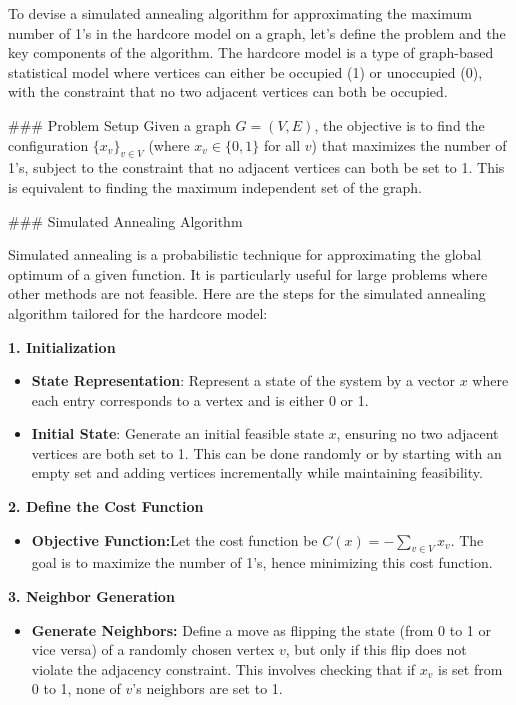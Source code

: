 \documentclass[8pt]{article}
\begin{document}
To devise a simulated annealing algorithm for approximating the maximum number of 1's in the hardcore model on a graph, let's define the problem and the key components of the algorithm. The hardcore model is a type of graph-based statistical model where vertices can either be occupied (1) or unoccupied (0), with the constraint that no two adjacent vertices can both be occupied.

### Problem Setup
Given a graph \( G = (V, E) \), the objective is to find the configuration \( \{x_v\}_{v \in V} \) (where \( x_v \in \{0, 1\} \) for all \( v \)) that maximizes the number of 1's, subject to the constraint that no adjacent vertices can both be set to 1. This is equivalent to finding the maximum independent set of the graph.

### Simulated Annealing Algorithm

Simulated annealing is a probabilistic technique for approximating the global optimum of a given function. It is particularly useful for large problems where other methods are not feasible. Here are the steps for the simulated annealing algorithm tailored for the hardcore model:

\textbf{1. Initialization}
\begin{itemize}
    \item \textbf{State Representation}: Represent a state of the system by a vector \( x \) where each entry corresponds to a vertex and is either 0 or 1.
    \item \textbf{Initial State}: Generate an initial feasible state \( x \), ensuring no two adjacent vertices are both set to 1. This can be done randomly or by starting with an empty set and adding vertices incrementally while maintaining feasibility.
\end{itemize}

\textbf{2. Define the Cost Function}
\begin{itemize}
    \item \textbf{Objective Function:}Let the cost function be \( C(x) = -\sum_{v \in V} x_v \). The goal is to maximize the number of 1's, hence minimizing this cost function.
\end{itemize}

\textbf{3. Neighbor Generation}
\begin{itemize}
    \item \textbf{Generate Neighbors:} Define a move as flipping the state (from 0 to 1 or vice versa) of a randomly chosen vertex \( v \), but only if this flip does not violate the adjacency constraint. This involves checking that if \( x_v \) is set from 0 to 1, none of \( v \)'s neighbors are set to 1.
\end{itemize}
\end{document}
